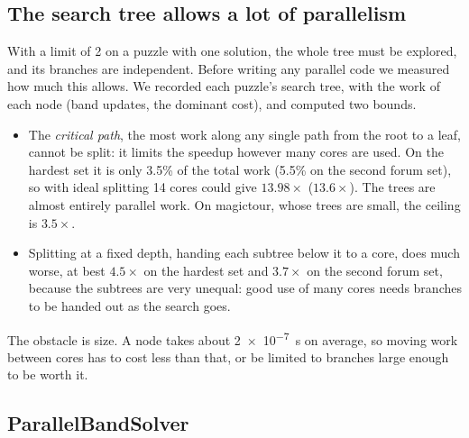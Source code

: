 \documentclass[11pt]{article}
\theoremstyle{definition}
\theoremstyle{plain}
\begin{document}
\subsection{The search tree allows a lot of parallelism}

With a limit of 2 on a puzzle with one solution, the whole tree must be explored, and its branches are independent.
Before writing any parallel code we measured how much this allows. We recorded each puzzle's search tree, with the work
of each node (band updates, the dominant cost), and computed two bounds.
\begin{itemize}
\item The \emph{critical path}, the most work along any single path from the root to a leaf, cannot be split: it limits
  the speedup however many cores are used. On the hardest set it is only 3.5\% of the total work (5.5\% on the second
  forum set), so with ideal splitting 14 cores could give $13.98\times$ ($13.6\times$). The trees are almost entirely
  parallel work. On magictour, whose trees are small, the ceiling is $3.5\times$.
\item Splitting at a fixed depth, handing each subtree below it to a core, does much worse, at best $4.5\times$ on the
  hardest set and $3.7\times$ on the second forum set, because the subtrees are very unequal: good use of many cores
  needs branches to be handed out as the search goes.
\end{itemize}

The obstacle is size. A node takes about \SI{2e-7}{\second} on average, so moving work between cores has to cost less than that,
or be limited to branches large enough to be worth it.

\subsection{ParallelBandSolver}
\end{document}

